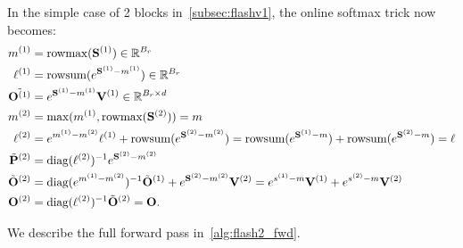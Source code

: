 In the simple case of 2 blocks in~\cref{subsec:flashv1}, the online softmax
trick now becomes:
\begin{align*}
  m^{(1)} &= \mathrm{rowmax}(\mathbf{S}^{(1)})  \in \mathbb{R}^{B_r}\\
  \ell^{(1)} &= \mathrm{rowsum}(e^{\mathbf{S}^{(1)} - m^{(1)}}) \in \mathbb{R}^{B_r} \\
  \tilde{\mathbf{O}^{(1)}} &= e^{\mathbf{S}^{(1)} - m^{(1)}} \mathbf{V}^{(1)} \in \mathbb{R}^{B_r \times d}\\
  m^{(2)} &= \max(m^{(1)}, \mathrm{rowmax}(\mathbf{S}^{(2)})) = m \\
  \ell^{(2)} &= e^{m^{(1)} - m^{(2)}} \ell^{(1)} + \mathrm{rowsum}(e^{\mathbf{S}^{(2)} - m^{(2)}}) = \mathrm{rowsum}(e^{\mathbf{S}^{(1)} - m}) + \mathrm{rowsum}(e^{\mathbf{S}^{(2)} - m}) = \ell \\
  \tilde{\mathbf{P}}^{(2)} &= \mathrm{diag}(\ell^{(2)})^{-1} e^{\mathbf{S}^{(2)} - m^{(2)}} \\
  \tilde{\mathbf{O}}^{(2)} &= \mathrm{diag}(e^{m^{(1)} - m^{(2)}})^{-1} \tilde{\mathbf{O}}^{(1)} + e^{\mathbf{S}^{(2)} - m^{(2)}} \mathbf{V}^{(2)} = e^{s^{(1)} - m} \mathbf{V}^{(1)} + e^{s^{(2)} - m} \mathbf{V}^{(2)} \\
  \mathbf{O}^{(2)} &= \mathrm{diag}(\ell^{(2)})^{-1} \tilde{\mathbf{O}}^{(2)} = \mathbf{O}.
\end{align*}

We describe the full \sysname forward pass in~\cref{alg:flash2_fwd}.

